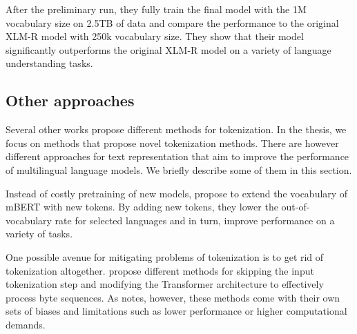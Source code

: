 After the preliminary run, they fully train the final model with the 1M vocabulary size on 2.5TB of data and compare the performance to the original XLM-R model with 250k vocabulary size. They show that their model significantly outperforms the original XLM-R model on a variety of language understanding tasks.






\subsection{Other approaches}

Several other works propose different methods for tokenization. In the thesis, we focus on methods that propose novel tokenization methods. There are however different approaches for text representation that aim to improve the performance of multilingual language models. We briefly describe some of them in this section.

Instead of costly pretraining of new models, \citet{wang_improving_2019} propose to extend the vocabulary of mBERT with new tokens. By adding new tokens, they lower the out-of-vocabulary rate for selected languages and in turn, improve performance on a variety of tasks. 

One possible avenue for mitigating problems of tokenization is to get rid of tokenization altogether. \citet{clark_canine_2022,tay_charformer_2022,xue_byt5_2022} propose different methods for skipping the input tokenization step and modifying the Transformer architecture to effectively process byte sequences. As \citet{mielke_between_2021} notes, however, these methods come with their own sets of biases and limitations such as lower performance or higher computational demands. 

